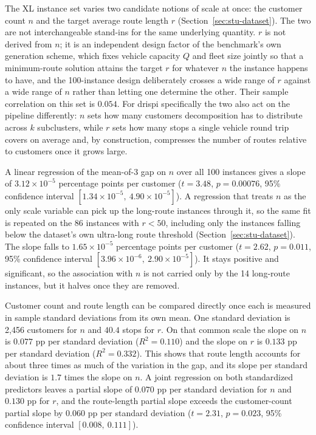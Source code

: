 The XL instance set varies two candidate notions of scale at once: the customer
count $n$ and the target average route length $r$ (Section~\ref{sec:stu-dataset}).
The two are not interchangeable stand-ins for the same underlying quantity.
$r$ is not derived from $n$; it is an independent design factor of the
benchmark's own generation scheme, which fixes vehicle capacity $Q$ and fleet
size jointly so that a minimum-route solution attains the target $r$ for
whatever $n$ the instance happens to have, and the 100-instance design
deliberately crosses a wide range of $r$ against a wide range of $n$ rather
than letting one determine the other. Their sample correlation on this set is
$0.054$. For \gls{drispi} specifically the two also act on the pipeline
differently: $n$ sets how many customers decomposition has to distribute across
$k$ subclusters, while $r$ sets how many stops a single vehicle round trip
covers on average and, by construction, compresses the number of routes
relative to customers once it grows large.

A linear regression of the mean-of-3 gap on $n$ over all 100 instances gives a
slope of $3.12 \times 10^{-5}$ percentage points per customer ($t = 3.48$,
$p = 0.00076$, 95\% confidence interval
$[1.34 \times 10^{-5},\ 4.90 \times 10^{-5}]$). A regression that treats $n$
as the only scale variable can pick up the long-route instances through it, so
the same fit is repeated on the 86 instances with $r < 50$, including only the instances falling below the dataset's own
ultra-long route threshold (Section~\ref{sec:stu-dataset}). The slope falls to $1.65 \times 10^{-5}$
percentage points per customer ($t = 2.62$, $p = 0.011$, 95\% confidence
interval $[3.96 \times 10^{-6},\ 2.90 \times 10^{-5}]$). It stays positive and
significant, so the association with $n$ is not carried only by the 14
long-route instances, but it halves once they are removed.

Customer count and route length can be compared directly once each is measured
in sample standard deviations from its own mean. One standard deviation is
2,456 customers for $n$ and $40.4$ stops for $r$. On that common scale the
slope on $n$ is $0.077$ pp per standard deviation ($R^2 = 0.110$) and the slope
on $r$ is $0.133$ pp per standard deviation ($R^2 = 0.332$). This shows that route length
accounts for about three times as much of the variation in the gap, and its
slope per standard deviation is $1.7$ times the slope on $n$. A joint
regression on both standardized predictors leaves a partial slope of $0.070$ pp
per standard deviation for $n$ and $0.130$ pp for $r$, and the route-length
partial slope exceeds the customer-count partial slope by $0.060$ pp per
standard deviation ($t = 2.31$, $p = 0.023$, 95\% confidence interval
$[0.008,\ 0.111]$).

